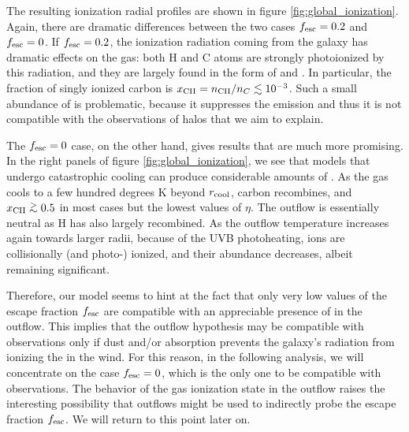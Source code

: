 The resulting ionization radial profiles are shown in figure \ref{fig:global_ionization}. Again, there are dramatic differences between the two cases $f_{\rm esc}=0.2$ and $f_{\rm esc}=0$. If $f_{\rm esc}=0.2$, the ionization radiation coming from the galaxy has dramatic effects on the gas: both H and C atoms are strongly photoionized by this radiation, and they are largely found in the form of \HII and \CIIIion. In particular, the fraction of singly ionized carbon is $x_{\rm CII}=n_{\rm CII}/n_C \lesssim 10^{-3}$. Such a small abundance of \CIIIion is problematic, because it suppresses the \CII emission and thus it is not compatible with the observations of \CII halos that we aim to explain. 

The $f_{\rm esc}=0$ case, on the other hand, gives results that are much more promising. In the right panels of figure \ref{fig:global_ionization}, we see that models that undergo catastrophic cooling can produce considerable amounts of \CIIion. As the gas cools to a few hundred degrees K beyond $r_{\rm cool}$, carbon recombines, and $x_{\rm CII} \gsim 0.5$ in most cases but the lowest values of $\eta$. The outflow is essentially neutral as H has also largely recombined. As the outflow temperature increases again towards larger radii, because of the UVB photoheating, \CIIion ions are collisionally (and photo-) ionized, and their abundance decreases, albeit remaining significant. 

Therefore, our model seems to hint at the fact that only very low values of the escape fraction $f_{\rm esc}$ are compatible with an appreciable presence of \CII in the outflow. This implies that the outflow hypothesis may be compatible with observations only if dust and/or \HI absorption prevents the galaxy's radiation from ionizing the \CIIion in the wind. For this reason, in the following analysis, we will concentrate on the case $f_{\rm esc}=0$, which is the only one to be compatible with observations. The behavior of the gas ionization state in the outflow raises the interesting possibility that outflows might be used to indirectly probe the escape fraction $f_{\rm esc}$. We will return to this point later on.


